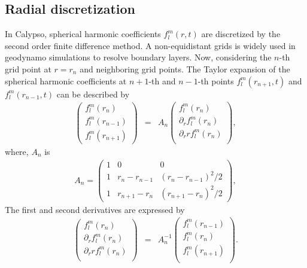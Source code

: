 \subsection{Radial discretization}
In Calypso, spherical harmonic coefficients $f_{l}^{m}(r, t)$ are discretized by the second order finite difference method. A non-equidistant grids is widely used in geodynamo simulations to resolve boundary layers. Now, considering the $n$-th grid point at $r = r_{n}$ and neighboring grid points. The Taylor expansion of the spherical harmonic coefficients at $n+1$-th and $n-1$-th points $f_{l}^{m}(r_{n+1}, t)$ and $f_{l}^{m}(r_{n-1}, t)$ can be described by
%
\begin{eqnarray}
\left( \begin{array}{c}
f_{l}^{m}(r_{n}) \\
f_{l}^{m}(r_{n-1}) \\
f_{l}^{m}(r_{n+1})
\end{array} \right)
 & = & 
A_{n}
\left( \begin{array}{c}
f_{l}^{m}(r_{n}) \\
\partial_r  f_{l}^{m}(r_{n}) \\
\partial_rr f_{l}^{m}(r_{n}) \\
\end{array} \right),
\end{eqnarray}
%
where, $A_{n}$ is
%
\begin{eqnarray}
A_{n} = 
\left( \begin{array}{ccc}
1 & 0 & 0  \\
1 & r_{n} - r_{n-1} & \left(r_{n} - r_{n-1} \right)^2 / 2 \\
1 & r_{n+1} - r_{n} & \left(r_{n+1} - r_{n} \right)^2 / 2
\end{array} \right),
\end{eqnarray}
%
The first and second derivatives are expressed by
%
\begin{eqnarray}
\left( \begin{array}{c}
f_{l}^{m}(r_{n}) \\
\partial_r  f_{l}^{m}(r_{n}) \\
\partial_rr f_{l}^{m}(r_{n}) \\
\end{array} \right)
 & = & 
A_{n}^{-1}
\left( \begin{array}{c}
f_{l}^{m}(r_{n-1}) \\
f_{l}^{m}(r_{n}) \\
f_{l}^{m}(r_{n+1}) \\
\end{array} \right).
\end{eqnarray}
%

